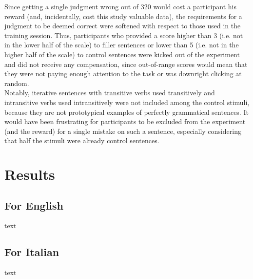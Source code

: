 Since getting a single judgment wrong out of 320 would cost a participant his reward (and, incidentally, cost this study valuable data), the requirements for a judgment to be deemed correct were softened with respect to those used in the training session. Thus, participants who provided a score higher than 3 (i.e. not in the lower half of the scale) to filler sentences or lower than 5 (i.e. not in the higher half of the scale) to control sentences were kicked out of the experiment and did not receive any compensation, since out-of-range scores would mean that they were not paying enough attention to the task or was downright clicking at random.\\ Notably, iterative sentences with transitive verbs used transitively and intransitive verbs used intransitively were not included among the control stimuli, because they are not prototypical examples of perfectly grammatical sentences. It would have been frustrating for participants to be excluded from the experiment (and the reward) for a single mistake on such a sentence, especially considering that half the stimuli were already control sentences.


\section{Results} 


\subsection{For English} 

text


\subsection{For Italian} 

text
